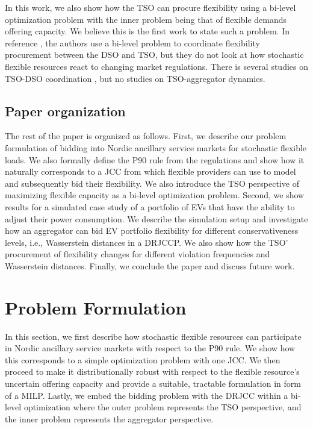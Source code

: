 \documentclass[conference]{IEEEtran}
\begin{document}
In this work, we also show how the \ac{TSO} can procure flexibility using a bi-level optimization problem with the inner problem being that of flexible demands offering capacity. We believe this is the first work to state such a problem. In reference \cite{sheikhahmadi2021bi}, the authors use a bi-level problem to coordinate flexibility procurement between the \ac{DSO} and \ac{TSO}, but they do not look at how stochastic flexible resources react to changing market regulations. There is several studies on \ac{TSO}-\ac{DSO} coordination \cite{givisiez2020review, jiang2022flexibility}, but no studies on \ac{TSO}-aggregator dynamics.

\subsection{Paper organization}

The rest of the paper is organized as follows. First, we describe our problem formulation of bidding into Nordic ancillary service markets for stochastic flexible loads. We also formally define the P90 rule from the regulations and show how it naturally corresponds to a \ac{JCC} from which flexible providers can use to model and subsequently bid their flexibility. We also introduce the \ac{TSO} perspective of maximizing flexible capacity as a bi-level optimization problem. Second, we show results for a simulated case study of a portfolio of \acp{EV} that have the ability to adjust their power consumption. We describe the simulation setup and investigate how an aggregator can bid \ac{EV} portfolio flexibility for different conservativeness levels, i.e., Wasserstein distances in a \ac{DRJCCP}. We also show how the \ac{TSO}' procurement of flexibility changes for different violation frequencies and Wasserstein distances. Finally, we conclude the paper and discuss future work.

\section{Problem Formulation}\label{sec:problem-formulation}

In this section, we first describe how stochastic flexible resources can participate in Nordic ancillary service markets with respect to the P90 rule. We show how this corresponds to a simple optimization problem with one \ac{JCC}. We then proceed to make it distributionally robust with respect to the flexible resource's uncertain offering capacity and provide a suitable, tractable formulation in form of a \ac{MILP}. Lastly, we embed the bidding problem with the \ac{DRJCC} within a bi-level optimization where the outer problem represents the \ac{TSO} perspective, and the inner problem represents the aggregator perspective.
\end{document}
